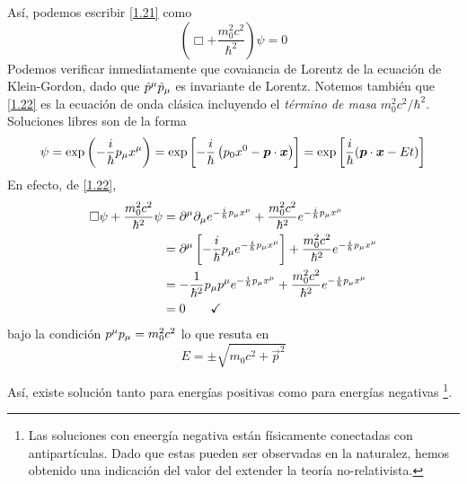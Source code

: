 Así, podemos escribir \eqref{1.21} como
\begin{equation}\label{1.22}
  \left(\Box+\frac{m_0^2c^2}{\hbar^2}\right)\psi=0
\end{equation}
Podemos verificar inmediatamente que covaiancia de Lorentz de la ecuación de Klein-Gordon, dado que $ \hat{p}^\mu \hat{p}_\mu$ es invariante de Lorentz. Notemos también que \eqref{1.22} es la ecuación de onda clásica incluyendo el \textit{término de masa} $m_0^2c^2/\hbar^2$. Soluciones libres son de la forma
\begin{equation}
  \psi=\exp\left(-\frac{i}{\hbar} p_\mu x^\mu \right)=\exp\left[-\frac{i}{\hbar}\left(p_0x^0-\vb*{p}\cdot\vb*{x}\right)\right]=\exp\left[\frac{i}{\hbar}(\vb*{p}\cdot\vb*{x}-Et)\right]
\end{equation}
En efecto, de \eqref{1.22},
\begin{align}
  \Box\psi+\frac{m_0^2c^2}{\hbar^2}\psi&=\partial^\mu\partial_\mu e^{-\frac{i}{\hbar}p_\mu x^\mu }+\frac{m_0^2c^2}{\hbar^2}e^{-\frac{i}{\hbar}p_\mu x^\mu }\\
  &=\partial^\mu \left[-\frac{i}{\hbar}p_\mu e^{-\frac{i}{\hbar}p_\mu x^\mu }\right]+\frac{m_0^2c^2}{\hbar^2}e^{-\frac{i}{\hbar}p_\mu x^\mu }\\
  &=-\frac{1}{\hbar^2}p_\mu p^\mu e^{-\frac{i}{\hbar}p_\mu x^\mu }+\frac{m_0^2c^2}{\hbar^2}e^{-\frac{i}{\hbar}p_\mu x^\mu }\\
  &=0\qquad \checkmark
\end{align}
bajo la condición $p^\mu p_\mu =m_0^2c^2$ lo que resuta en
\begin{equation}\label{1.24}
  E=\pm \sqrt{m_0c^2+\vec{p}^2}
\end{equation}



Así, existe solución tanto para energías positivas como para energías negativas \footnote{Las soluciones con eneergía negativa están físicamente conectadas con antipartículas. Dado que estas pueden ser observadas en la naturalez, hemos obtenido una indicación del valor del extender la teoría no-relativista.}.

